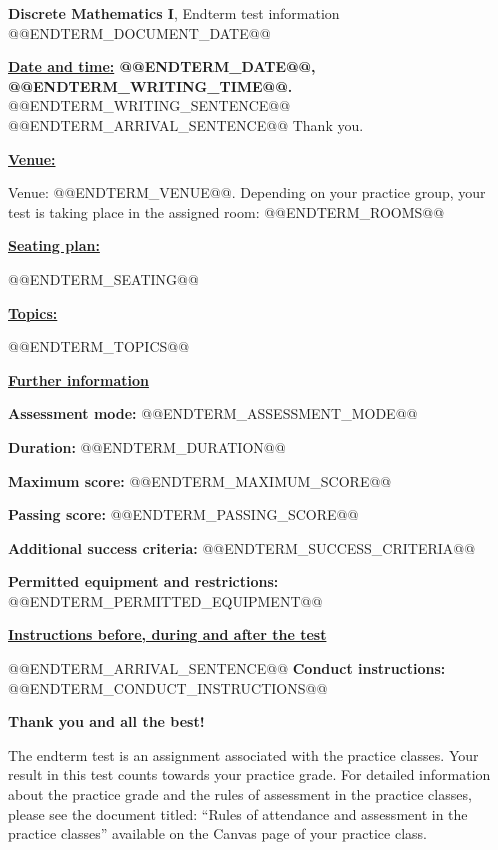 \documentclass[11pt,a4paper]{article}
\newcommand{\heading}[1]{\par\medskip\textbf{\underline{#1}}\par}
\begin{document}
\begin{center}\large
\textbf{Discrete Mathematics I}, Endterm test information\\
@@ENDTERM_DOCUMENT_DATE@@
\end{center}
\bigskip
\textbf{\underline{Date and time:} @@ENDTERM_DATE@@, @@ENDTERM_WRITING_TIME@@.}
@@ENDTERM_WRITING_SENTENCE@@
@@ENDTERM_ARRIVAL_SENTENCE@@
Thank you.

\heading{Venue:}
Venue: @@ENDTERM_VENUE@@.
Depending on your practice group, your test is taking place in the assigned room:
@@ENDTERM_ROOMS@@

\heading{Seating plan:}
@@ENDTERM_SEATING@@

\heading{Topics:}
@@ENDTERM_TOPICS@@

\heading{Further information}
\textbf{Assessment mode:} @@ENDTERM_ASSESSMENT_MODE@@\par
\textbf{Duration:} @@ENDTERM_DURATION@@\par
\textbf{Maximum score:} @@ENDTERM_MAXIMUM_SCORE@@\par
\textbf{Passing score:} @@ENDTERM_PASSING_SCORE@@\par
\textbf{Additional success criteria:} @@ENDTERM_SUCCESS_CRITERIA@@\par
\textbf{Permitted equipment and restrictions:} @@ENDTERM_PERMITTED_EQUIPMENT@@

\heading{Instructions before, during and after the test}
@@ENDTERM_ARRIVAL_SENTENCE@@
\textbf{Conduct instructions:} @@ENDTERM_CONDUCT_INSTRUCTIONS@@

\textbf{Thank you and all the best!}

The endterm test is an assignment associated with the practice classes. Your result in this test counts towards your practice grade. For detailed information about the practice grade and the rules of assessment in the practice classes, please see the document titled: ``Rules of attendance and assessment in the practice classes'' available on the Canvas page of your practice class.
\end{document}
